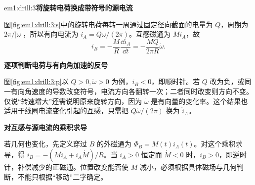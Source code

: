 \begin{drillsolution}{em1:drill:3}\textbf{将旋转电荷换成带符号的源电流}\par\nobreak
图\ref{fig:em1:drill:3:s}中的旋转电荷每转一周通过固定径向截面的电量为 $Q$，周期为 $2\pi/|\omega|$，所以有向电流为 $i_A=Q\omega/(2\pi)$。互感磁通为 $Mi_A$，故
\[i_B=-\frac{M}{R}\frac{\dd i_A}{\dd t}=-\frac{MQ}{2\pi R}\dot\omega.\]



\par\medskip{}\noindent\textbf{逐项判断电荷与有向角加速的反号}\par\nobreak
图\ref{fig:em1:drill:3:p}以 $Q>0,\dot\omega>0$ 为例，$i_B<0$，即顺时针。若 $Q$ 改为负，或同一有向角速度的导数改变符号，电流方向各翻转一次；二者同时改变则方向不变。仅说“转速增大”还需说明原来旋转方向，因为 $\dot\omega$ 是有向量的变化率。这个结果也适用于线圈电流变化引起的互感，只需把 $Q\dot\omega/(2\pi)$ 换为 $\dot i_A$。



\par\medskip{}\noindent\textbf{对互感与源电流的乘积求导}\par\nobreak
若几何也变化，先定义穿过 $B$ 的外磁通为 $\Phi_B=M(t)i_A(t)$。对这个乘积求导，得 $i_B=-(M\dot i_A+i_A\dot M)/R$。当 $i_A>0$ 恒定而 $\dot M<0$ 时，$i_B>0$，即逆时针，补偿减少的正磁通。位置改变能否使 $M$ 减小，必须根据具体磁场与几何判断，不能只根据“移动”二字确定。\end{drillsolution}
